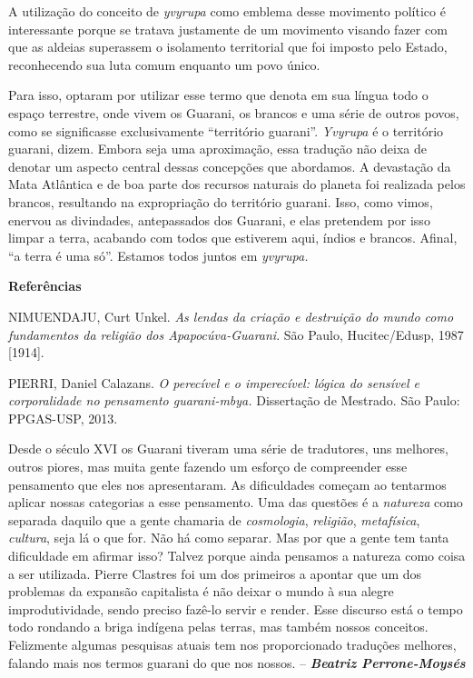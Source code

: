 A utilização do conceito de \emph{yvyrupa} como emblema desse movimento
político é interessante porque se tratava justamente de um movimento
visando fazer com que as aldeias superassem o isolamento territorial que
foi imposto pelo Estado, reconhecendo sua luta comum enquanto um povo
único.

Para isso, optaram por utilizar esse termo que denota em sua língua todo
o espaço terrestre, onde vivem os Guarani, os brancos e uma série de
outros povos, como se significasse exclusivamente ``território
guarani''. \emph{Yvyrupa} é o território guarani, dizem. Embora seja uma
aproximação, essa tradução não deixa de denotar um aspecto central
dessas concepções que abordamos. A devastação da Mata Atlântica e de boa
parte dos recursos naturais do planeta foi realizada pelos brancos,
resultando na expropriação do território guarani. Isso, como vimos,
enervou as divindades, antepassados dos Guarani, e elas pretendem por
isso limpar a terra, acabando com todos que estiverem aqui, índios e
brancos. Afinal, ``a terra é uma só''. Estamos todos juntos em
\emph{yvyrupa.}

\textbf{Referências}

NIMUENDAJU, Curt Unkel. \emph{As lendas da criação e destruição do mundo
como fundamentos da religião dos Apapocúva-Guarani}. São Paulo,
Hucitec/Edusp, 1987 {[}1914{]}.

PIERRI, Daniel Calazans. \emph{O perecível e o imperecível: lógica do
sensível e corporalidade no pensamento guarani-mbya.} Dissertação de
Mestrado. São Paulo: PPGAS-USP, 2013.

Desde o século XVI os Guarani tiveram uma série de tradutores, uns
melhores, outros piores, mas muita gente fazendo um esforço de
compreender esse pensamento que eles nos apresentaram. As dificuldades
começam ao tentarmos aplicar nossas categorias a esse pensamento. Uma
das questões é a \emph{natureza} como separada daquilo que a gente
chamaria de \emph{cosmologia}, \emph{religião}, \emph{metafísica},
\emph{cultura}, seja lá o que for. Não há como separar. Mas por que a
gente tem tanta dificuldade em afirmar isso? Talvez porque ainda
pensamos a natureza como coisa a ser utilizada. Pierre Clastres foi um
dos primeiros a apontar que um dos problemas da expansão capitalista é
não deixar o mundo à sua alegre improdutividade, sendo preciso fazê-lo
servir e render. Esse discurso está o tempo todo rondando a briga
indígena pelas terras, mas também nossos conceitos. Felizmente algumas
pesquisas atuais tem nos proporcionado traduções melhores, falando mais
nos termos guarani do que nos nossos. -- \emph{\textbf{Beatriz
Perrone-Moysés}}

